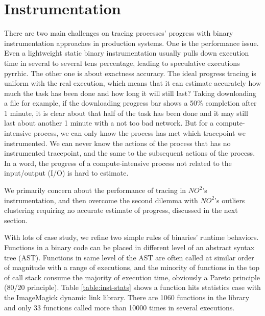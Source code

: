 \section{Instrumentation}

There are two main challenges on tracing processes' progress with binary instrumentation approaches in production systems. One is the performance issue. Even a lightweight static binary instrumentation usually pulls down execution time in several to several tens percentage, leading to speculative executions pyrrhic.  The other one is about exactness accuracy. The ideal progress tracing is uniform with the real execution, which means that it can estimate accurately how much the task has been done and how long it will still last? Taking downloading a file for example, if the downloading progress bar shows a 50\% completion after 1 minute, it is clear about that half of the task has been done and it may still last about another 1 minute with a not too bad network. But for a compute-intensive process, we can only know the process has met which tracepoint we instrumented. We can never know the actions of the process that has no instrumented tracepoint, and the same to the subsequent actions of the process. In a word, the progress of a compute-intensive process not related to the input/output (I/O) is hard to estimate.

We primarily concern about the performance of tracing in $NO^2$'s instrumentation, and then overcome the second dilemma with $NO^2$'s outliers clustering requiring no accurate estimate of progress, discussed in the next section.

With lots of case study, we refine two simple rules of binaries' runtime behaviors. Functions in a binary code can be placed in different level of an abstract syntax tree (AST). Functions in same level of the AST are often called at similar order of magnitude with a range of executions, and the minority of functions in the top of call stack consume the majority of execution time, obviously a Pareto principle (80/20 principle). Table \ref{table:inst-stats} shows a function hits statistics case with the ImageMagick dynamic link library. There are 1060 functions in the library and only 33 functions called more than 10000 times in several executions.

